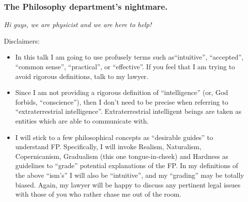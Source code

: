 \begin{frame}
\frametitle{The Philosophy department's nightmare.}

{\em Hi guys, we are physicist and we are here to help!}
\vspace{0.5cm}

Disclaimers: 

\begin{itemize}
\item In this talk I am going to use profusely terms  such as``intuitive'', ``accepted'', ``common sense'', ``practical'', or ``effective''.  If you feel that I am trying to avoid rigorous definitions, talk to my lawyer.  
\item Since I am not providing a rigorous definition of ``intelligence''  (or, God forbids, ``conscience''), then I don't need to be precise when referring to ``extraterrestrial intelligence''. Extraterrestrial intelligent beings are taken as entities which are able to communicate with. 
\item I will stick to a few philosophical concepts as ``desirable guides'' to understand FP. Specifically, I will invoke Realism, Naturalism, Copernicanism, Gradualism (this one tongue-in-cheek) and Hardness as guidelines to  ``grade'' potential explanations of the FP. In my definitions of the above ``ism's'' I will also be ``intuitive'', and my ``grading'' may be totally biased. Again, my lawyer will be happy to discuss any pertinent legal issues with those of you who rather chase me out of the room.  
\end{itemize}

\end{frame}

%
%
%
%
%
%
%



